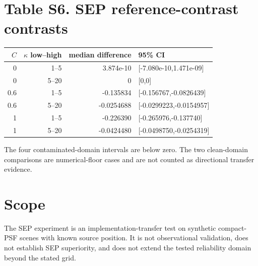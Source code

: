 \documentclass[9pt]{article}
\begin{document}
\section*{Table S6. SEP reference-contrast contrasts}
\begin{center}\small\begin{tabular}{rrrl}\toprule $C$&$\kappa$ low--high&median difference&95\% CI\\\midrule
0&1--5&3.874e-10&[-7.080e-10,1.471e-09]\\0&5--20&0&[0,0]\\0.6&1--5&-0.135834&[-0.156767,-0.0826439]\\0.6&5--20&-0.0254688&[-0.0299223,-0.0154957]\\1&1--5&-0.226390&[-0.265976,-0.137740]\\1&5--20&-0.0424480&[-0.0498750,-0.0254319]\\\bottomrule\end{tabular}\end{center}
The four contaminated-domain intervals are below zero. The two clean-domain comparisons are numerical-floor cases and are not counted as directional transfer evidence.
\section*{Scope}
The SEP experiment is an implementation-transfer test on synthetic compact-PSF scenes with known source position. It is not observational validation, does not establish SEP superiority, and does not extend the tested reliability domain beyond the stated grid.
\end{document}

